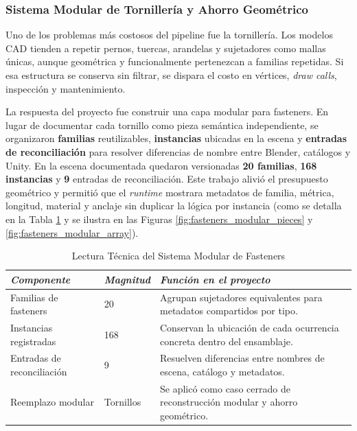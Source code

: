 \FloatBarrier
\subsubsection{Sistema Modular de Tornillería y Ahorro Geométrico}

Uno de los problemas más costosos del pipeline fue la tornillería. Los modelos CAD tienden a repetir pernos, tuercas, arandelas y sujetadores como mallas únicas, aunque geométrica y funcionalmente pertenezcan a familias repetidas. Si esa estructura se conserva sin filtrar, se dispara el costo en vértices, \textit{draw calls}, inspección y mantenimiento.

La respuesta del proyecto fue construir una capa modular para fasteners. En lugar de documentar cada tornillo como pieza semántica independiente, se organizaron \textbf{familias} reutilizables, \textbf{instancias} ubicadas en la escena y \textbf{entradas de reconciliación} para resolver diferencias de nombre entre Blender, catálogos y Unity. En la escena documentada quedaron versionadas \textbf{20 familias}, \textbf{168 instancias} y \textbf{9} entradas de reconciliación. Este trabajo alivió el presupuesto geométrico y permitió que el \textit{runtime} mostrara metadatos de familia, métrica, longitud, material y anclaje sin duplicar la lógica por instancia (como se detalla en la Tabla \ref{tab:fasteners_modulares_runtime} y se ilustra en las Figuras \ref{fig:fasteners_modular_pieces} y \ref{fig:fasteners_modular_array}).

\begin{table}[htbp]
    \caption{Lectura Técnica del Sistema Modular de Fasteners}
    \label{tab:fasteners_modulares_runtime}
    \begin{tabularx}{\textwidth}{p{3.4cm}p{2.6cm}X}
        \hline
        \textit{Componente} & \textit{Magnitud} & \textit{Función en el proyecto} \\ \hline
        Familias de fasteners & 20 & Agrupan sujetadores equivalentes para metadatos compartidos por tipo. \\
        Instancias registradas & 168 & Conservan la ubicación de cada ocurrencia concreta dentro del ensamblaje. \\
        Entradas de reconciliación & 9 & Resuelven diferencias entre nombres de escena, catálogo y metadatos. \\
        Reemplazo modular & Tornillos & Se aplicó como caso cerrado de reconstrucción modular y ahorro geométrico. \\ \hline
    \end{tabularx}
\end{table}

